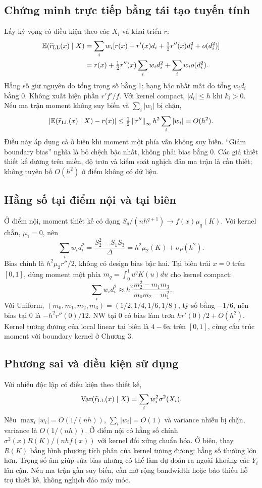 \subsection{Chứng minh trực tiếp bằng tái tạo tuyến tính}
Lấy kỳ vọng có điều kiện theo các $X_i$ và khai triển $r$:
\begin{align*}
\mathbb E(\widehat r_{\rm LL}(x)\mid X)
&=\sum_iw_i[r(x)+r'(x)d_i+\tfrac12r''(x)d_i^2+o(d_i^2)]\\
&=r(x)+\tfrac12r''(x)\sum_iw_id_i^2+
\sum_iw_io(d_i^2).
\end{align*}
Hằng số giữ nguyên do tổng trọng số bằng 1; hạng bậc nhất mất do tổng
$w_id_i$ bằng 0. Không xuất hiện phần $r'f'/f$.
Với kernel compact, $|d_i|\leq h$ khi $k_i>0$.
Nếu ma trận moment không suy biến và $\sum_i|w_i|$ bị chặn,
\[
|\mathbb E(\widehat r_{\rm LL}(x)\mid X)-r(x)|
\leq\tfrac12\left\lVert r''\right\rVert_\infty h^2\sum_i|w_i|=O(h^2).
\]
Điều này áp dụng cả ở biên khi moment một phía vẫn không suy biến.
``Giảm boundary bias'' nghĩa là bỏ chệch bậc nhất, không phải bias bằng 0.
Các giả thiết thiết kế dương trên miền, độ trơn và kiểm soát nghịch đảo
ma trận là cần thiết; không tuyên bố $O(h^2)$ ở điểm không có dữ liệu.

\subsection{Hằng số tại điểm nội và tại biên}
Ở điểm nội, moment thiết kế có dạng
$S_q/(nh^{q+1})\to f(x)\mu_q(K)$. Với kernel chẵn,
$\mu_1=0$, nên
\[
\sum_iw_id_i^2=\frac{S_2^2-S_1S_3}{\Delta}
=h^2\mu_2(K)+o_P(h^2).
\]
Bias chính là $h^2\mu_2r''/2$, không có design bias bậc hai.
Tại biên trái $x=0$ trên $[0,1]$, dùng moment một phía
$m_q=\int_0^1u^qK(u)du$ cho kernel compact:
\[
\sum_iw_id_i^2\approx
h^2\frac{m_2^2-m_1m_3}{m_0m_2-m_1^2}.
\]
Với Uniform, $(m_0,m_1,m_2,m_3)=(1/2,1/4,1/6,1/8)$,
tỷ số bằng $-1/6$, nên bias tại 0 là $-h^2r''(0)/12$.
NW tại 0 có bias làm trơn $hr'(0)/2+O(h^2)$.
Kernel tương đương của local linear tại biên là $4-6u$ trên $[0,1]$,
cùng cấu trúc moment với boundary kernel ở Chương 3.

\subsection{Phương sai và điều kiện sử dụng}
Với nhiễu độc lập có điều kiện theo thiết kế,
\[
\operatorname{Var}(\widehat r_{\rm LL}(x)\mid X)=\sum_iw_i^2\sigma^2(X_i).
\]
Nếu $\max_i|w_i|=O(1/(nh))$, $\sum_i|w_i|=O(1)$ và variance nhiễu
bị chặn, variance là $O(1/(nh))$.
Ở điểm nội có hằng số chính $\sigma^2(x)R(K)/(nhf(x))$ với kernel
đối xứng chuẩn hóa. Ở biên, thay $R(K)$ bằng bình phương tích phân của
kernel tương đương; hằng số thường lớn hơn.
Trọng số âm giúp sửa bias nhưng có thể làm dự đoán ra ngoài khoảng các
$Y_i$ lân cận. Nếu ma trận gần suy biến, cần mở rộng bandwidth hoặc
báo thiếu hỗ trợ thiết kế, không nghịch đảo máy móc.

